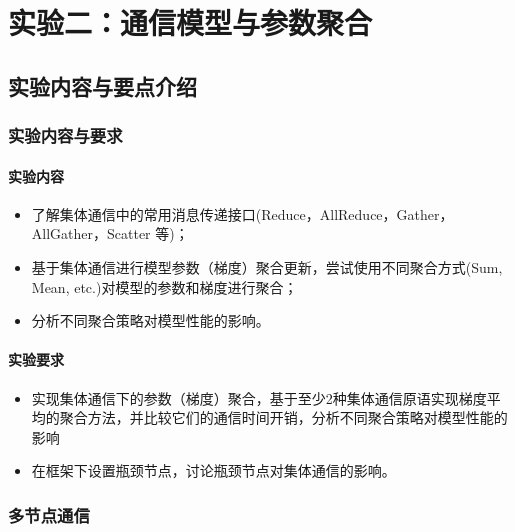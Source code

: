 \chapter{实验二：通信模型与参数聚合}

\section{实验内容与要点介绍}

\subsection{实验内容与要求}

\subsubsection{实验内容}
\begin{itemize}
    \item 了解集体通信中的常用消息传递接口(Reduce，AllReduce，Gather，AllGather，Scatter 等)；
    \item 基于集体通信进行模型参数（梯度）聚合更新，尝试使用不同聚合方式(Sum, Mean, etc.)对模型的参数和梯度进行聚合；
    \item 分析不同聚合策略对模型性能的影响。
\end{itemize}

\subsubsection{实验要求}
\begin{itemize}
    \item 实现集体通信下的参数（梯度）聚合，基于至少2种集体通信原语实现梯度平均的聚合方法，并比较它们的通信时间开销，分析不同聚合策略对模型性能的影响
    \item 在框架下设置瓶颈节点，讨论瓶颈节点对集体通信的影响。
\end{itemize}

\subsection{多节点通信}

